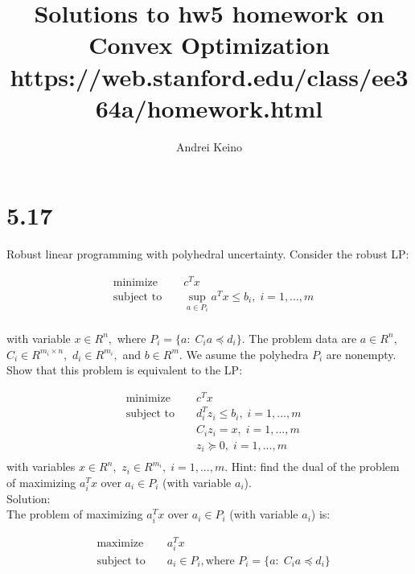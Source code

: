 \documentclass{article}
\begin{document}
\title{Solutions to hw5 homework on Convex Optimization https://web.stanford.edu/class/ee364a/homework.html}
\author{Andrei Keino}
\maketitle



\section*{5.17}
Robust linear programming with polyhedral uncertainty. Consider the robust LP:

\begin{align*}
&\text{minimize } && c^T x \\
&\text{subject to } &&\sup_{a \in P_i} a^T x \leq b_i, \; i = 1, ... , m\\
\end{align*} 

with variable $x \in R^n, $ where
$P_i = \{a: \; C_i a \preceq d_i \}.$ The problem data are $a \in R^n,$ $C_i \in R^{m_i \times n}, $ $d_i \in R^{m_i}, $ and $b \in R^m.$ We asume the polyhedra $P_i$ are nonempty. Show that this problem is equivalent to the LP:

\begin{align*}
&\text{minimize } && c^T x \\
&\text{subject to } &&d_i^T z_i \leq b_i,
\; i = 1, ... , m\\
& && C_i z_i = x, \; i = 1, ... , m\\
& && z_i \succeq 0, \; i = 1, ... , m\\
\end{align*} 
with variables $x \in R^n, $ 
$z_i \in R^{m_i}, \; i = 1, ... , m.$ 
Hint: find the dual of the problem of maximizing 
$a_i^T x$ over $a_i \in P_i$ (with variable $a_i$).\\

Solution: \\

The problem of maximizing 
$a_i^T x$ over $a_i \in P_i$ (with variable $a_i$) is:

\begin{align*}
&\text{maximize } && a_i^T x \\
&\text{subject to } &&a_i \in P_i, \text{where } 
P_i = \{a: \; C_i a \preceq d_i \}\\
\end{align*} 
\end{document}
